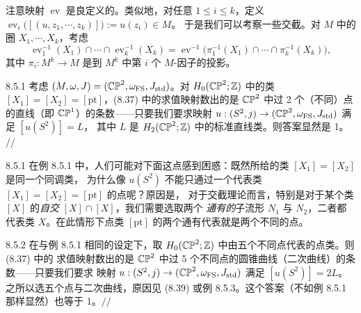 注意映射 $\operatorname{ev}$ 是良定义的。类似地，对任意 $1\le i\le k$，定义
$\operatorname{ev}_i\big([(u,z_1,\cdots,z_k)]\big):=u(z_i)\in M$。
于是我们可以考察一些交截。对 $M$ 中的圈 $X_1,\cdots,X_k$，考虑
\begin{equation}
  \operatorname{ev}_1^{-1}(X_1)\cap\cdots\cap\operatorname{ev}_k^{-1}(X_k)
  =\operatorname{ev}^{-1}\big(\pi_1^{-1}(X_1)\cap\cdots\cap\pi_k^{-1}(X_k)\big),
  \tag{8.37}
\end{equation}
其中 $\pi_i:M^k\to M$ 是到 $M^k$ 中第 $i$ 个 $M$-因子的投影。

\begin{wexam}{8.5.1}
考虑 $(M,\omega,J)=(\mathbb{CP}^2,\omega_{\mathrm{FS}},J_{\mathrm{std}})$。对
$H_0(\mathbb{CP}^2;\mathbb{Z})$ 中的类 $[X_1]=[X_2]=[\mathrm{pt}]$，(8.37) 中的求值映射数出的是
$\mathbb{CP}^2$ 中过 2 个（不同）点的直线（即 $\mathbb{CP}^1$）的条数——只要我们要求映射
$u:(S^2,j)\to(\mathbb{CP}^2,\omega_{\mathrm{FS}},J_{\mathrm{std}})$ 满足 $[u(S^2)]=L$，
其中 $L$ 是 $H_2(\mathbb{CP}^2;\mathbb{Z})$ 中的标准直线类。则答案显然是 1。\hspace*{\fill}$//$
\end{wexam}

\begin{wrem}{8.5.1}
在例 8.5.1 中，人们可能对下面这点感到困惑：既然所给的类 $[X_1]=[X_2]$ 是同一个同调类，
为什么像 $u(S^2)$ 不能只通过一个代表类 $[X_1]=[X_2]=[\mathrm{pt}]$ 的点呢？原因是，
对于交截理论而言，特别是对于某个类 $[X]$ 的\emph{自交} $[X]\cap[X]$，我们需要选取两个
\emph{通有的}子流形 $N_1$ 与 $N_2$，二者都代表类 $X$。在此情形下点类 $[\mathrm{pt}]$
的两个通有代表就是两个不同的点。
\end{wrem}

\begin{wexam}{8.5.2}
在与例 8.5.1 相同的设定下，取 $H_0(\mathbb{CP}^2;\mathbb{Z})$ 中由五个不同点代表的点类。则 (8.37) 中的
求值映射数出的是 $\mathbb{CP}^2$ 中过 5 个不同点的圆锥曲线（二次曲线）的条数——只要我们要求
映射 $u:(S^2,j)\to(\mathbb{CP}^2,\omega_{\mathrm{FS}},J_{\mathrm{std}})$ 满足
$[u(S^2)]=2L$。之所以选五个点与二次曲线，原因见 (8.39) 或例 8.5.3。这个答案（不如例
8.5.1 那样显然）也等于 1。\hspace*{\fill}$//$
\end{wexam}

